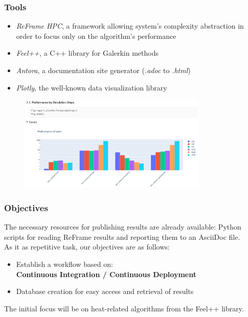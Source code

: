 \documentclass[10pt]{beamer}
\begin{document}
\begin{frame}
    \frametitle{\textbf{Tools}}
    \begin{itemize}
        \addtolength{\itemsep}{10pt}
        \item \textit{ReFrame HPC}, a framework allowing system's complexity abstraction in order to focus only on the algorithm's performance
        \item \textit{Feel++}, a C++ library for Galerkin methods
        \item \textit{Antora}, a documentation site generator \small(\textit{.adoc} to \textit{.html})
        \item \textit{Plotly}, the well-known data visualization library
    \end{itemize}
    \begin{figure}
        \centering
        \includegraphics[width=0.8\textwidth]{../illustrations/benchmarking-graphics.png}
      \end{figure}
\end{frame}


\begin{frame}
    \frametitle{\textbf{Objectives}}
    The necessary resources for publishing results are already available:
    Python scripts for reading ReFrame results and reporting them to an AsciiDoc file.\\
    As it as repetitive task, our objectives are as follows:\\
    [10pt]
    \begin{itemize}
        \addtolength{\itemsep}{10pt}
        \item Establish a workflow based on:\\
                [0.2cm]
                \textbf{Continuous Integration / Continuous Deployment}
        \item Database creation for easy access and retrieval of results\\
        [1cm]
    \end{itemize}
    The initial focus will be on heat-related algorithms from the Feel++ library.\\
\end{frame}
\end{document}

